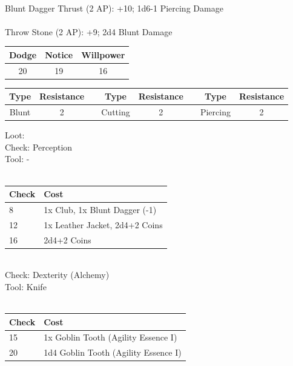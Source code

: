 \\
Blunt Dagger Thrust (2 AP): +10; 1d6-1 Piercing Damage\\
\\
Throw Stone (2 AP): +9; 2d4 Blunt Damage\\
\begin{minipage}[H]{1\textwidth}
    \centering
    \begin{tabular}[c]{|c | c | c|}
        \hline
        Dodge & Notice & Willpower\\
        \hline
        20 & 19 & 16\\
        \hline
    \end{tabular}
\end{minipage}
\begin{minipage}[H]{1\textwidth}
    \centering
    \begin{tabular}[c]{|c | c | c | c | c | c | c | c|}
        \hline
        Type & Resistance && Type & Resistance && Type & Resistance\\
        \hline
        Blunt & 2 &&
        Cutting & 2 &&
        Piercing & 2\\
        \hline
    \end{tabular}
\end{minipage}
Loot:\\
Check: Perception\\
Tool: -\\
\\
\begin{minipage}{0.8\textwidth}
    \begin{tabular}{|l | l|}
        \hline
        Check & Cost\\
        \hline
        8 & 1x Club, 1x Blunt Dagger (-1)\\
        12 & 1x Leather Jacket, 2d4+2 Coins\\
        16 & 2d4+2 Coins\\
        \hline
    \end{tabular}
\end{minipage}
\\
Check: Dexterity (Alchemy)\\
Tool: Knife\\
\\
\begin{minipage}{0.8\textwidth}
    \begin{tabular}{|l | l|}
        \hline
        Check & Cost\\
        \hline
        15 & 1x Goblin Tooth (Agility Essence I)\\
        20 & 1d4 Goblin Tooth (Agility Essence I)\\
        \hline
    \end{tabular}
\end{minipage}
\pagebreak